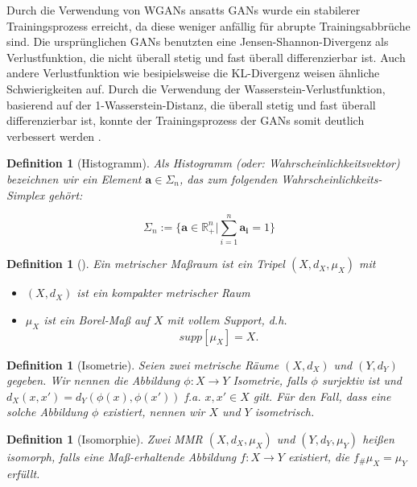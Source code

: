\documentclass[11pt,a4paper]{article}
\def\emph#1{\textit{#1}}
\newtheorem{definition}[theorem]{Definition}
\numberwithin{equation}{section}
\begin{document}
	Durch die Verwendung von WGANs ansatts GANs wurde ein stabilerer Trainingsprozess erreicht, da diese weniger anfällig für abrupte Trainingsabbrüche sind. Die ursprünglichen GANs benutzten eine Jensen-Shannon-Divergenz als Verlustfunktion, die nicht überall stetig und fast überall differenzierbar ist. Auch andere Verlustfunktion wie besipielsweise die KL-Divergenz weisen ähnliche Schwierigkeiten auf. Durch die Verwendung der Wasserstein-Verlustfunktion, basierend auf der 1-Wasserstein-Distanz, die überall stetig und fast überall differenzierbar ist, konnte der Trainingsprozess der GANs somit deutlich verbessert werden \cite{mauryaoptimal}.
	
	

	\begin{definition}[Histogramm]
		Als Histogramm (oder: Wahrscheinlichkeitsvektor) bezeichnen wir ein Element $\boldsymbol{a} \in \Sigma_n$, das zum folgenden Wahrscheinlichkeits-Simplex gehört:
		
		\begin{equation*}
		\Sigma_n := \lbrace \boldsymbol{a} \in \mathbb{R}_{+}^n | \sum_{i=1}^n{\boldsymbol{a_i} = 1} \rbrace
		\end{equation*}
	\end{definition}


\begin{definition}[\cite{gromov2007metric}]
	Ein \emph{metrischer Maßraum} ist ein Tripel $(X,d_X,\mu_X)$ mit
	\begin{itemize}
		\item $(X, d_X)$ ist ein kompakter metrischer Raum
		\item $\mu_X$ ist ein Borel-Maß auf $X$ mit vollem Support, d.h. 
		\begin{equation}
			supp[\mu_X] = X.\label{eq:bed_mmspaces}
		\end{equation} 
	\end{itemize}
\end{definition}
\begin{definition}[Isometrie]
	Seien zwei metrische Räume $(X, d_X)$ und $(Y,d_Y)$ gegeben. Wir nennen die Abbildung $\phi:X \to Y$ Isometrie, falls $\phi$ surjektiv ist und $d_X(x,x')= d_Y(\phi(x),\phi(x'))$ f.a. $x, x' \in X$ gilt. Für den Fall, dass eine solche Abbildung $\phi$ existiert, nennen wir $X$ und $Y$ isometrisch.
\end{definition}

\begin{definition}[Isomorphie]
	Zwei MMR $(X,d_X,\mu_X)$ und $(Y,d_Y,\mu_Y)$ heißen isomorph, falls eine Maß-erhaltende Abbildung $f:X \to Y$ existiert, die $f_\#\mu_X = \mu_Y$ erfüllt.
\end{definition}
\end{document}
